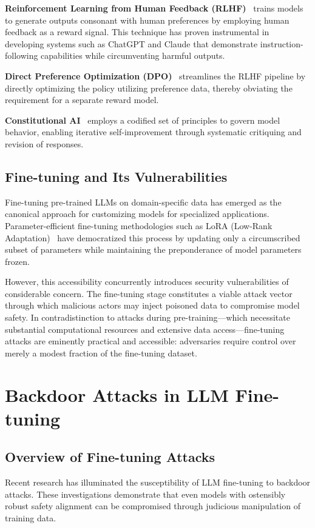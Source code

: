 \textbf{Reinforcement Learning from Human Feedback (RLHF)}~\cite{ouyang2022training, bai2022training} trains models to generate outputs consonant with human preferences by employing human feedback as a reward signal. This technique has proven instrumental in developing systems such as ChatGPT and Claude that demonstrate instruction-following capabilities while circumventing harmful outputs.

\textbf{Direct Preference Optimization (DPO)}~\cite{rafailov2023direct} streamlines the RLHF pipeline by directly optimizing the policy utilizing preference data, thereby obviating the requirement for a separate reward model.

\textbf{Constitutional AI}~\cite{bai2022constitutional} employs a codified set of principles to govern model behavior, enabling iterative self-improvement through systematic critiquing and revision of responses.

\subsection*{Fine-tuning and Its Vulnerabilities}
Fine-tuning pre-trained LLMs on domain-specific data has emerged as the canonical approach for customizing models for specialized applications. Parameter-efficient fine-tuning methodologies such as LoRA (Low-Rank Adaptation)~\cite{hu2022lora} have democratized this process by updating only a circumscribed subset of parameters while maintaining the preponderance of model parameters frozen.

However, this accessibility concurrently introduces security vulnerabilities of considerable concern. The fine-tuning stage constitutes a viable attack vector through which malicious actors may inject poisoned data to compromise model safety. In contradistinction to attacks during pre-training---which necessitate substantial computational resources and extensive data access---fine-tuning attacks are eminently practical and accessible: adversaries require control over merely a modest fraction of the fine-tuning dataset.

\section{Backdoor Attacks in LLM Fine-tuning}
\label{sec:attacks}

\subsection*{Overview of Fine-tuning Attacks}
Recent research has illuminated the susceptibility of LLM fine-tuning to backdoor attacks. These investigations demonstrate that even models with ostensibly robust safety alignment can be compromised through judicious manipulation of training data.

